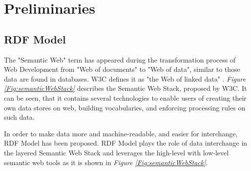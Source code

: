 \chapter{Preliminaries}
\label{ch:preliminaries}


\section{RDF Model}
The "Semantic Web" \cite{W3C:SemanticWebTerm:Online} term  has appeared during the transformation process of Web Development from "Web of documents" to "Web of data", similar to those data are found in databases. W3C defines it as "the Web of linked data" . {\it Figure \ref{Fig:semanticWebStack}} describes the Semantic Web Stack, proposed by W3C. It can be seen, that it contains several technologies to enable users of creating their own data stores on web, building vocabularies, and enforcing processing rules on such data.   
\vspace{5mm} %
\par
In order to make data more and machine-readable, and easier for interchange, RDF Model \cite{W3C:RDF-Primer:Online} has been proposed. RDF Model plays the role of data interchange in the layered Semantic Web Stack and leverages the high-level with low-level semantic web tools as it is shown in {\it Figure \ref{Fig:semanticWebStack}}. 

